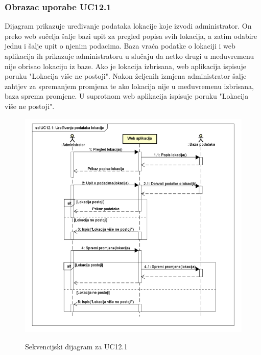			\subsubsection{Obrazac uporabe UC12.1}
			\textnormal{Dijagram prikazuje uređivanje podataka lokacije koje izvodi administrator. On preko web sučelja šalje bazi upit za pregled popisa svih lokacija, a zatim odabire jednu i šalje upit o njenim podacima. Baza vraća podatke o lokaciji i web aplikacija ih prikazuje administratoru u slučaju da netko drugi u međuvremenu nije obrisao lokaciju iz baze. Ako je lokacija izbrisana, web aplikacija ispisuje poruku "Lokacija više ne postoji". Nakon željenih izmjena administrator šalje zahtjev za spremanjem promjena te ako lokacija nije u međuvremenu izbrisana, baza sprema promjene. U suprotnom web aplikacija ispisuje poruku "Lokacija više ne postoji".}\\
			\begin{figure}[H]
				\centering
				\includegraphics[scale=0.52]{dijagrami/UC12.1} \\
				\caption{Sekvencijski dijagram za UC12.1}
				\label{fig:UC12.1_sekvencijski}
			\end{figure}
		\eject
			
